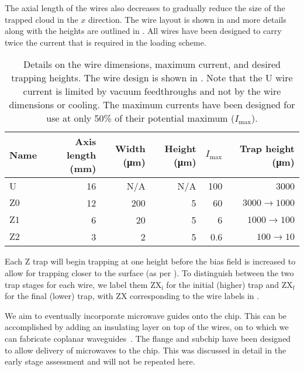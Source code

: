 The axial length  of the wires also decreases to gradually reduce the size of
the trapped cloud in the $x$ direction. The wire layout is shown in
 and more details along with the
heights are outlined in . All wires have
been designed to carry twice the current that is required in the loading
scheme.

%
\begin{table}
  \centering
\begin{tabular}{lrrrrr}
  Name & Axis length (\si{\milli\meter}) & Width (\si{\micro\meter})& Height
  (\si{\micro\meter})& $I_\text{max}$ & Trap height (\si{\micro\meter}) \\
 \hline
  U & 16 & N/A& N/A& 100 & 3000\\
  $\mathrm{Z0}$ & 12 & 200&  5& 60& $3000\rightarrow1000$ \\
  $\mathrm{Z1}$ &  6 & 20&  5& 6& $1000\rightarrow100$ \\
  $\mathrm{Z2}$ &  3 & 2&  5& 0.6& $100\rightarrow10$ \\
 \hline
\end{tabular}
  \caption{Details on the wire dimensions, maximum current, and desired
  trapping heights. The wire design is shown in
  . Note that the U wire current is
  limited by vacuum feedthroughs and not by the wire dimensions or cooling.
  The maximum currents have been designed for use at only 50\% of their
  potential maximum ($I_\text{max}$).
  }
  \label{design:table:wires}
\end{table}

Each Z trap will begin trapping at one height before the bias field is
increased to allow for trapping closer to the surface (as per
).  To distinguish between the two trap stages for
each wire, we label them $\mathrm{ZX_i}$ for the initial (higher) trap and
$\mathrm{ZX_f}$ for the final (lower) trap, with $\mathrm{ZX}$ corresponding to
the wire labels in .

We aim to eventually incorporate microwave guides onto the chip. This can be
accomplished by adding an insulating layer on top of the wires, on to which we
can fabricate coplanar waveguides~\cite{1127105}. The flange and subchip have
been designed to allow delivery of microwaves to the chip.  This was discussed in detail in the early stage
assessment and will not be repeated here.

